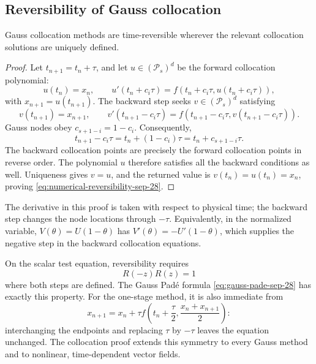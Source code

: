 \subsection{Reversibility of Gauss collocation}

\begin{theorem}
 Gauss collocation methods are time-reversible wherever the
 relevant collocation solutions are uniquely defined.
\end{theorem}

\begin{proof}
 Let \(t_{n+1}=t_n+\tau\), and let \(u\in(\mathcal P_s)^d\)
 be the forward collocation polynomial:
 \[
  u(t_n)=x_n,\qquad
  u'(t_n+c_i\tau)=f(t_n+c_i\tau,u(t_n+c_i\tau)),
 \]
 with \(x_{n+1}=u(t_{n+1})\). The backward step seeks
 \(v\in(\mathcal P_s)^d\) satisfying
 \[
  v(t_{n+1})=x_{n+1},\qquad
  v'(t_{n+1}-c_i\tau)
    =f(t_{n+1}-c_i\tau,v(t_{n+1}-c_i\tau)).
 \]
 Gauss nodes obey \(c_{s+1-i}=1-c_i\). Consequently,
 \[
  t_{n+1}-c_i\tau
    =t_n+(1-c_i)\tau=t_n+c_{s+1-i}\tau.
 \]
 The backward collocation points are precisely the forward
 collocation points in reverse order. The polynomial \(u\)
 therefore satisfies all the backward conditions as well.
 Uniqueness gives \(v=u\), and the returned value is
 \(v(t_n)=u(t_n)=x_n\), proving
 \eqref{eq:numerical-reversibility-sep-28}.
\end{proof}

The derivative in this proof is taken with respect to physical
time; the backward step changes the node locations through
\(-\tau\). Equivalently, in the normalized variable,
\(V(\theta)=U(1-\theta)\) has
\(V'(\theta)=-U'(1-\theta)\), which supplies the negative step
in the backward collocation equations.

On the scalar test equation, reversibility requires
\[
 R(-z)R(z)=1
\]
where both steps are defined. The Gauss Pad\'e formula
\eqref{eq:gauss-pade-sep-28} has exactly this property.
For the one-stage method, it is also immediate from
\[
 x_{n+1}=x_n+\tau f\left(t_n+\frac\tau2,
                              \frac{x_n+x_{n+1}}2\right):
\]
interchanging the endpoints and replacing \(\tau\) by
\(-\tau\) leaves the equation unchanged. The collocation proof
extends this symmetry to every Gauss method and to nonlinear,
time-dependent vector fields.
